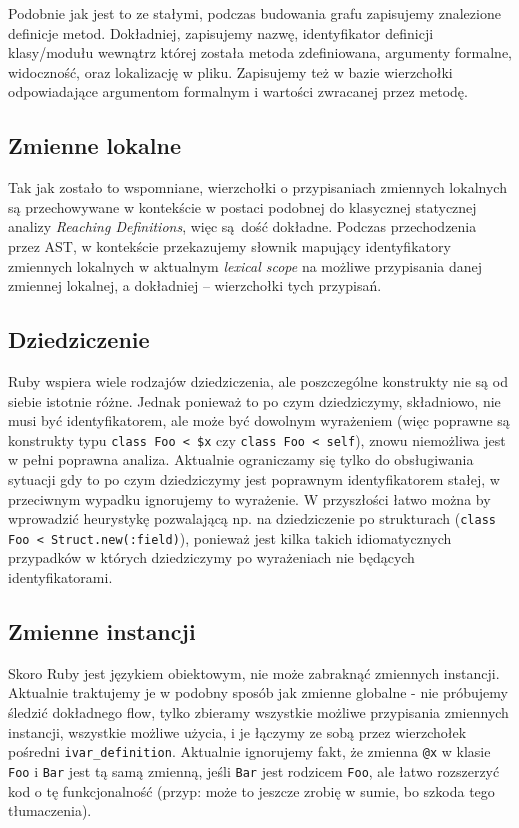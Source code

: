\documentclass[declaration,shortabstract]{iithesis}
\begin{document}
Podobnie jak jest to ze stałymi, podczas budowania grafu zapisujemy znalezione definicje metod. Dokładniej, zapisujemy nazwę, identyfikator definicji klasy/modułu wewnątrz której została metoda zdefiniowana, argumenty formalne, widoczność, oraz lokalizację w pliku. Zapisujemy też w bazie wierzchołki odpowiadające argumentom formalnym i wartości zwracanej przez metodę.

\subsection{Zmienne lokalne}

Tak jak zostało to wspomniane, wierzchołki o przypisaniach zmiennych lokalnych są przechowywane w kontekście w postaci podobnej do klasycznej statycznej analizy \textit{Reaching Definitions}, więc są dość dokładne. Podczas przechodzenia przez AST, w kontekście przekazujemy słownik mapujący identyfikatory zmiennych lokalnych w aktualnym \textit{lexical scope} na możliwe przypisania danej zmiennej lokalnej, a dokładniej -- wierzchołki tych przypisań.

\subsection{Dziedziczenie}

Ruby wspiera wiele rodzajów dziedziczenia, ale poszczególne konstrukty nie są od siebie istotnie różne. Jednak ponieważ to po czym dziedziczymy, składniowo, nie musi być identyfikatorem, ale może być dowolnym wyrażeniem (więc poprawne są konstrukty typu \texttt{class Foo < \$x} czy \texttt{class Foo < self}), znowu niemożliwa jest w pełni poprawna analiza. Aktualnie ograniczamy się tylko do obsługiwania sytuacji gdy to po czym dziedziczymy jest poprawnym identyfikatorem stałej, w przeciwnym wypadku ignorujemy to wyrażenie. W przyszłości łatwo można by wprowadzić heurystykę pozwalającą np. na dziedziczenie po strukturach (\texttt{class Foo < Struct.new(:field)}), ponieważ jest kilka takich idiomatycznych przypadków w których dziedziczymy po wyrażeniach nie będących identyfikatorami.

\subsection{Zmienne instancji}

Skoro Ruby jest językiem obiektowym, nie może zabraknąć zmiennych instancji. Aktualnie traktujemy je w podobny sposób jak zmienne globalne - nie próbujemy śledzić dokładnego flow, tylko zbieramy wszystkie możliwe przypisania zmiennych instancji, wszystkie możliwe użycia, i je łączymy ze sobą przez wierzchołek pośredni \texttt{ivar\_definition}. Aktualnie ignorujemy fakt, że zmienna \texttt{@x} w klasie \texttt{Foo} i \texttt{Bar} jest tą samą zmienną, jeśli \texttt{Bar} jest rodzicem \texttt{Foo}, ale łatwo rozszerzyć kod o tę funkcjonalność (przyp: może to jeszcze zrobię w sumie, bo szkoda tego tłumaczenia).
\end{document}
